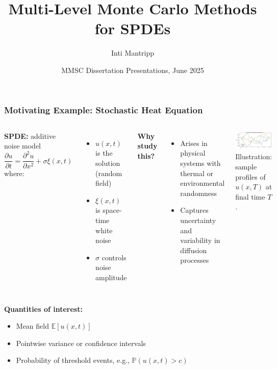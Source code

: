 \documentclass[aspectratio=169]{beamer}
\title[Multi-Level Monte Carlo for SPDEs] %
{Multi-Level Monte Carlo Methods for SPDEs} %
\author{Inti Mantripp}
\institute{Mathematical Institute\\University of Oxford}
\date[6 June 2025]  %
{MMSC Dissertation Presentations, June 2025} %
\begin{document}
\begin{frame}[plain]
  \titlepage
\end{frame}

\begin{frame}
  \frametitle{Motivating Example: Stochastic Heat Equation}
  \begin{columns}
    \textbf{SPDE:} additive noise model
    \[
    \frac{\partial u}{\partial t} = \frac{\partial^2 u}{\partial x^2} + \sigma \xi(x,t)
    \]
    \vspace{1em}
    where:
    \begin{itemize}
      \item \( u(x,t) \) is the solution (random field)
      \item \( \xi(x,t) \) is space-time white noise
      \item \( \sigma \) controls noise amplitude
    \end{itemize}

    \vspace{1em}
    \textbf{Why study this?}
    \begin{itemize}
      \item Arises in physical systems with thermal or environmental randomness
      \item Captures uncertainty and variability in diffusion processes
    \end{itemize}

    \includegraphics[width=\textwidth]{graphics/stochastic_heat_equation_intro.jpeg}
    \vspace{0.5em}
    \small Illustration: sample profiles of \( u(x,T) \) at final time $T$.
  \end{columns}

  \vspace{1em}
  \textbf{Quantities of interest:}
  \begin{itemize}
    \item Mean field \( \mathbb{E}[u(x,t)] \)
    \item Pointwise variance or confidence intervals
    \item Probability of threshold events, e.g., \( \mathbb{P}(u(x,t) > c) \)
  \end{itemize}

\end{frame}
\end{document}
